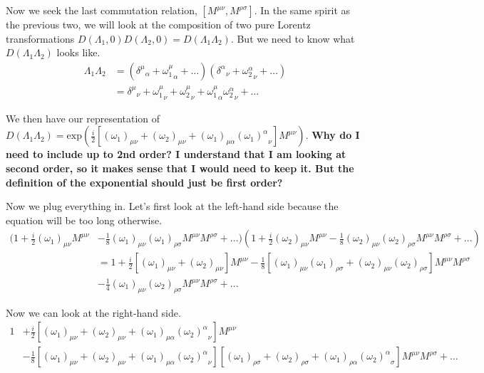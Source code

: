 \documentclass[12pt]{article}
\begin{document}
Now we seek the last commutation relation, $[M^{\mu\nu},M^{\rho\sigma}]$. In the same spirit as the previous two, we will look at the composition of two pure Lorentz transformations $D(\Lambda_1,0)D(\Lambda_2,0)=D(\Lambda_1\Lambda_2)$. But we need to know what $D(\Lambda_1\Lambda_2)$ looks like.
\begin{align*}
    \Lambda_1\Lambda_2&=({\delta^\mu}_\alpha+{\omega_1^\mu}_\alpha+\dots)({\delta^\alpha}_\nu+{\omega_2^\alpha}_\nu+\dots) \\
    &={\delta^\mu}_\nu+{\omega_1^\mu}_\nu+{\omega_2^\mu}_\nu+{\omega_1^\mu}_\alpha{\omega_2^\alpha}_\nu+\dots
\end{align*}

We then have our representation of $D(\Lambda_1\Lambda_2)=\text{exp}(\frac{i}{2}[(\omega_1)_{\mu\nu}+(\omega_2)_{\mu\nu}+(\omega_1)_{\mu\alpha}{(\omega_1)^\alpha}_\nu]M^{\mu\nu})$. \textbf{Why do I need to include up to 2nd order? I understand that I am looking at second order, so it makes sense that I would need to keep it. But the definition of the exponential should just be first order?}

Now we plug everything in. Let's first look at the left-hand side because the equation will be too long otherwise.
\begin{align*}
    (1+\frac{i}{2}(\omega_1)_{\mu\nu}M^{\mu\nu}&-\frac{1}{8}(\omega_1)_{\mu\nu}(\omega_1)_{\rho\sigma}M^{\mu\nu}M^{\rho\sigma}+\dots)(1+\frac{i}{2}(\omega_2)_{\mu\nu}M^{\mu\nu}-\frac{1}{8}(\omega_2)_{\mu\nu}(\omega_2)_{\rho\sigma}M^{\mu\nu}M^{\rho\sigma}+\dots) \\
    &=1+\frac{i}{2}[(\omega_1)_{\mu\nu}+(\omega_2)_{\mu\nu}]M^{\mu\nu}-\frac{1}{8}[(\omega_1)_{\mu\nu}(\omega_1)_{\rho\sigma}+(\omega_2)_{\mu\nu}(\omega_2)_{\rho\sigma}]M^{\mu\nu}M^{\rho\sigma} \\
    &-\frac{1}{4}(\omega_1)_{\mu\nu}(\omega_2)_{\rho\sigma}M^{\mu\nu}M^{\rho\sigma}+\dots
\end{align*}

Now we can look at the right-hand side.
\begin{align*}
    1&+\frac{i}{2}[(\omega_1)_{\mu\nu}+(\omega_2)_{\mu\nu}+(\omega_1)_{\mu\alpha}{(\omega_2)^\alpha}_\nu]M^{\mu\nu} \\
    &-\frac{1}{8}[(\omega_1)_{\mu\nu}+(\omega_2)_{\mu\nu}+(\omega_1)_{\mu\alpha}{(\omega_2)^\alpha}_\nu][(\omega_1)_{\rho\sigma}+(\omega_2)_{\rho\sigma}+(\omega_1)_{\rho\alpha}{(\omega_2)^\alpha}_\sigma]M^{\mu\nu}M^{\rho\sigma}+\dots
\end{align*}
\end{document}
